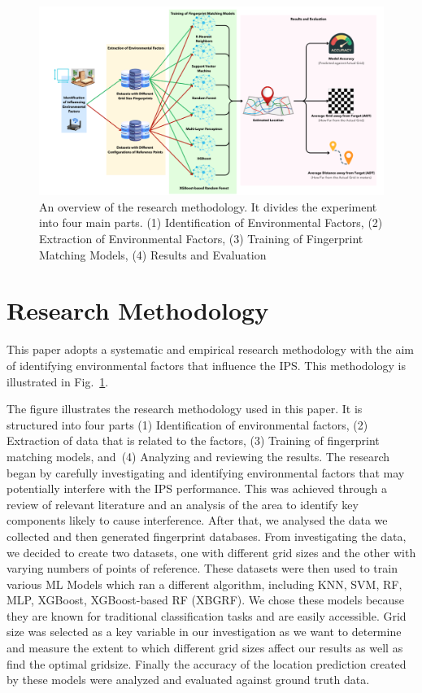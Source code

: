 \documentclass[runningheads]{llncs}
\begin{document}
\begin{figure}
	\includegraphics[width=\textwidth]{meth1.png}
	\caption{An overview of the research methodology. It divides the experiment into four main parts. (1) Identification of Environmental Factors, (2) Extraction of Environmental Factors, (3) Training of Fingerprint Matching Models, (4) Results and Evaluation}
	\label{fig:graph_step}
\end{figure}

\section{Research Methodology}
This paper adopts a systematic and empirical research methodology with the aim of identifying environmental factors that influence the IPS. This methodology is illustrated in Fig.~\ref{fig:graph_step}.

The figure illustrates the research methodology used in this paper. It is structured into four parts (1) Identification of environmental factors, (2) Extraction of data that is related to the factors, (3) Training of fingerprint matching models, and~(4) Analyzing and reviewing the results. The research began by carefully investigating and identifying environmental factors that may potentially interfere with the IPS performance. This was achieved through a review of relevant literature and an analysis of the area to identify key components likely to cause interference. After that, we analysed the data we collected and then generated fingerprint databases. From investigating the data, we decided to create two datasets, one with different grid sizes and the other with varying numbers of points of reference. These datasets were then used to train various ML Models which ran a different algorithm, including KNN, SVM, RF, MLP, XGBoost, XGBoost-based RF (XBGRF). We chose these models because they are known for traditional classification tasks and are easily accessible. Grid size was selected as a key variable in our investigation as we want to determine and measure the extent to which different grid sizes affect our results as well as find the optimal gridsize. Finally the accuracy of the location prediction created by these models were analyzed and evaluated against ground truth data.
\end{document}
